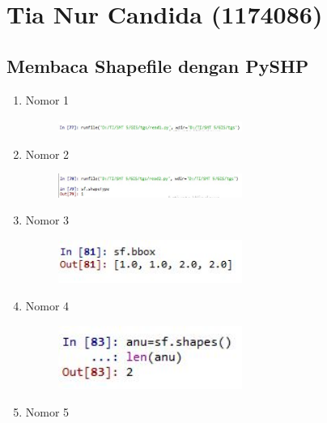 \section{Tia Nur Candida (1174086)}
\subsection{Membaca Shapefile dengan PySHP}
\begin{enumerate}
	\item Nomor 1
	
	\begin{figure}[H]
		\includegraphics[width=6cm]{figures/Tugas3/1174086/No1.jpg}
		\centering
	\end{figure}
	\item Nomor 2
	
	\begin{figure}[H]
		\includegraphics[width=6cm]{figures/Tugas3/1174086/No2.jpg}
		\centering
	\end{figure}
	\item Nomor 3
	
	\begin{figure}[H]
		\includegraphics[width=6cm]{figures/Tugas3/1174086/No3.jpg}
		\centering
	\end{figure}
	\item Nomor 4
	
	\begin{figure}[H]
		\includegraphics[width=6cm]{figures/Tugas3/1174086/No4.jpg}
		\centering
	\end{figure}
	\item Nomor 5
	
	\begin{figure}[H]

\end{figure}
\end{enumerate}
